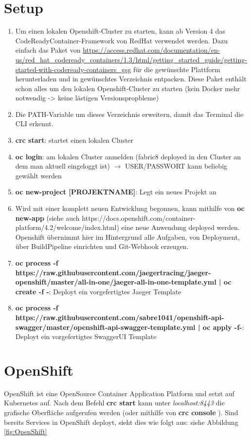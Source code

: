 \documentclass[11pt, a4paper]{article}   	%
\begin{document}
\section{Setup}
\begin{enumerate}
	\item Um einen lokalen Openshift-Cluster zu starten, kann ab Version 4 das CodeReadyContainer-Framework von RedHat verwendet werden. Dazu einfach das Paket von \url{https://access.redhat.com/documentation/en-us/red_hat_codeready_containers/1.3/html/getting_started_guide/getting-started-with-codeready-containers_gsg} für die gewünschte Plattform herunterladen und in gewünschtes Verzeichnis entpacken. Diese Paket enthält schon alles um den lokalen Openshift-Cluster zu starten (kein Docker mehr notwendig -> keine lästigen Versionspropbleme)
	\item Die PATH-Variable um dieses Verzeichnis erweitern, damit das Terminal die CLI erkennt.
	\item \textbf{crc start}: startet einen lokalen Cluster
	\item \textbf{oc login}: am lokalen Cluster anmelden (fabric8 deployed in den Cluster an dem man aktuell eingeloggt ist) $\rightarrow$ USER/PASSWORT kann beliebig gewählt werden
	\item \textbf{oc new-project [PROJEKTNAME]}: Legt ein neues Projekt an
	\item Wird mit einer komplett neuen Entwicklung begonnen, kann mithilfe von \textbf{oc new-app} (siehe auch https://docs.openshift.com/container-platform/4.2/welcome/index.html) eine neue Anwendung deployed werden. Openshift übernimmt hier im Hintergrund alle Aufgaben, von Deployment, über BuildPipeline einrichten und Git-Webhook erzeugen. 
	\item \textbf{oc process -f https://raw.githubusercontent.com/jaegertracing/jaeger-openshift/master/all-in-one/jaeger-all-in-one-template.yml | oc create -f -}: Deployt ein vorgefertigtes Jaeger Template
	\item \textbf{oc process -f https://raw.githubusercontent.com/sabre1041/openshift-api-swagger/master/openshift-api-swagger-template.yml | oc apply -f-}: Deployt ein vorgefertigtes SwaggerUI Template
\end{enumerate}

\section{OpenShift}
OpenShift ist eine OpenSource Container Application Platform und setzt auf Kubernetes auf.
Nach dem Befehl \textbf{crc start} kann unter \textit{localhost:8443} die grafische Oberfläche aufgerufen werden (oder mithilfe von \textbf{crc console} ).
Sind bereits Services in OpenShift deployt, sieht dies wie folgt aus:
siehe Abbildung \ref{fig:OpenShift}
\end{document}
